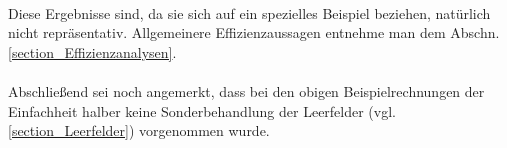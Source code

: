 \phantom \\ \noindent
Diese Ergebnisse sind, da sie sich auf ein spezielles Beispiel beziehen, natürlich nicht repräsentativ. Allgemeinere Effizienzaussagen entnehme man dem Abschn. \ref{section_Effizienzanalysen}.\\
\\
Abschließend sei noch angemerkt, dass bei den obigen Beispielrechnungen der Einfachheit halber keine Sonderbehandlung der Leerfelder (vgl. \ref{section_Leerfelder}) vorgenommen wurde.





